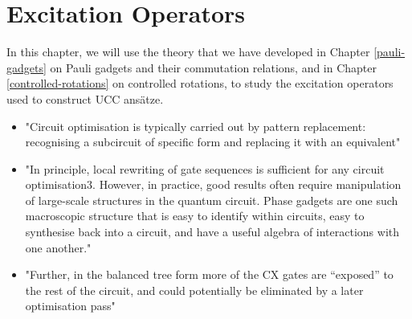 \chapter{Excitation Operators}%
\label{excitation-operators}

In this chapter, we will use the theory that we have developed in Chapter \ref{pauli-gadgets} on Pauli gadgets and their commutation relations, and in Chapter \ref{controlled-rotations} on controlled rotations, to study the excitation operators used to construct UCC ansätze.


\begin{itemize}[itemsep=-5pt]
    \item "Circuit optimisation is typically carried out by pattern replacement: recognising a subcircuit of specific form and replacing it with an equivalent" \cite{Cowtan2019}
    \item "In principle, local rewriting of gate sequences is sufficient for any circuit optimisation3. However, in practice, good results often require manipulation of large-scale structures in the quantum circuit. Phase gadgets are one such macroscopic structure that is easy to identify within circuits, easy to synthesise back into a circuit, and have a useful algebra of interactions with one another." \cite{Cowtan2019}
    \item "Further, in the balanced tree form more of the CX gates are “exposed” to the rest of the circuit, and could potentially be eliminated by a later optimisation pass" \cite{Cowtan2019}
\end{itemize}
